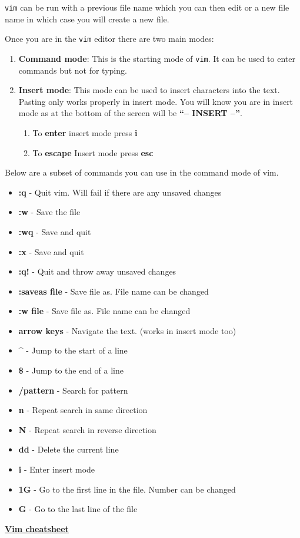 \documentclass[
  letterpaper,
  DIV=11,
  numbers=noendperiod]{scrreprt}
\providecommand{\tightlist}{%
  \setlength{\itemsep}{0pt}\setlength{\parskip}{0pt}}
\begin{document}
\texttt{vim} can be run with a previous file name which you can then
edit or a new file name in which case you will create a new file.

Once you are in the \texttt{vim} editor there are two main modes:

\begin{enumerate}
\def\labelenumi{\arabic{enumi}.}
\tightlist
\item
  \textbf{Command mode}: This is the starting mode of \texttt{vim}. It
  can be used to enter commands but not for typing.
\item
  \textbf{Insert mode}: This mode can be used to insert characters into
  the text. Pasting only works properly in insert mode. You will know
  you are in insert mode as at the bottom of the screen will be
  \textbf{``-- INSERT --''}.

  \begin{enumerate}
  \def\labelenumii{\arabic{enumii}.}
  \tightlist
  \item
    To \textbf{enter} insert mode press \textbf{i}
  \item
    To \textbf{escape} Insert mode press \textbf{esc}
  \end{enumerate}
\end{enumerate}

Below are a subset of commands you can use in the command mode of vim.

\begin{itemize}
\tightlist
\item
  \textbf{:q} - Quit vim. Will fail if there are any unsaved changes
\item
  \textbf{:w} - Save the file
\item
  \textbf{:wq} - Save and quit
\item
  \textbf{:x} - Save and quit
\item
  \textbf{:q!} - Quit and throw away unsaved changes
\item
  \textbf{:saveas file} - Save file as. File name can be changed
\item
  \textbf{:w file} - Save file as. File name can be changed
\item
  \textbf{arrow keys} - Navigate the text. (works in insert mode too)
\item
  \textbf{\^{}} - Jump to the start of a line
\item
  \textbf{\$} - Jump to the end of a line
\item
  \textbf{/pattern} - Search for pattern
\item
  \textbf{n} - Repeat search in same direction
\item
  \textbf{N} - Repeat search in reverse direction
\item
  \textbf{dd} - Delete the current line
\item
  \textbf{i} - Enter insert mode
\item
  \textbf{1G} - Go to the first line in the file. Number can be changed
\item
  \textbf{G} - Go to the last line of the file
\end{itemize}

\href{https://vim.rtorr.com/}{\textbf{Vim cheatsheet}}
\end{document}
